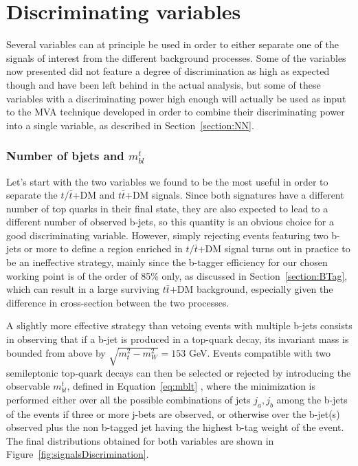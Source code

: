 \documentclass[a4paper, 10pt, openright]{report}
\begin{document}
\section{Discriminating variables} \label{section:Variables}

Several variables can at principle be used in order to either separate one of the signals of interest from the different background processes. Some of the variables now presented did not feature a degree of discrimination as high as expected though and have been left behind in the actual analysis, but some of these variables with a discriminating power high enough will actually be used as input to the \ac{MVA} technique developed in order to combine their discriminating power into a single variable, as described in Section~\ref{section:NN}.

\subsubsection*{Number of bjets and $m_{bl}^t$}

Let's start with the two variables we found to be the most useful in order to separate the $t/\bar t$+DM and $t \bar t$+DM signals. Since both signatures have a different number of top quarks in their final state, they are also expected to lead to a different number of observed b-jets, so this quantity is an obvious choice for a good discriminating variable. However, simply rejecting events featuring two b-jets or more to define a region enriched in $t/ \bar t$+DM signal turns out in practice to be an ineffective strategy, mainly since the b-tagger efficiency for our chosen working point is of the order of 85\% only, as discussed in Section~\ref{section:BTag}, which can result in a large surviving $t \bar t$+DM background, especially given the difference in cross-section between the two processes.

A slightly more effective strategy than vetoing events with multiple b-jets consists in observing that if a b-jet is produced in a top-quark decay, its invariant mass is bounded from above by $\sqrt{m_t^2 - m_{W}^2} = 153$ GeV. Events compatible with two semileptonic top-quark decays can then be selected or rejected by introducing the observable $m_{bl}^t$, defined in Equation~\ref{eq:mblt} \cite{mblt}, where the minimization is performed either over all the possible combinations of jets {$j_a, j_b$} among the b-jets of the events if three or more j-bets are observed, or otherwise over the b-jet(s) observed plus the non b-tagged jet having the highest b-tag weight of the event. The final distributions obtained for both variables are shown in Figure~\ref{fig:signalsDiscrimination}.
\end{document}
